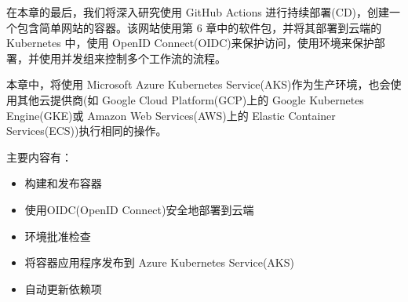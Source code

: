 在本章的最后，我们将深入研究使用 GitHub Actions 进行持续部署(CD)，创建一个包含简单网站的容器。该网站使用第 6 章中的软件包，并将其部署到云端的 Kubernetes 中，使用 OpenID Connect(OIDC)来保护访问，使用环境来保护部署，并使用并发组来控制多个工作流的流程。

本章中，将使用 Microsoft Azure Kubernetes Service(AKS)作为生产环境，也会使用其他云提供商(如 Google Cloud Platform(GCP)上的 Google Kubernetes Engine(GKE)或 Amazon Web Services(AWS)上的 Elastic Container Services(ECS))执行相同的操作。

主要内容有：

\begin{itemize}
\item 
构建和发布容器

\item 
使用OIDC(OpenID Connect)安全地部署到云端
\item 
环境批准检查

\item 
将容器应用程序发布到 Azure Kubernetes Service(AKS)

\item 
自动更新依赖项
\end{itemize}